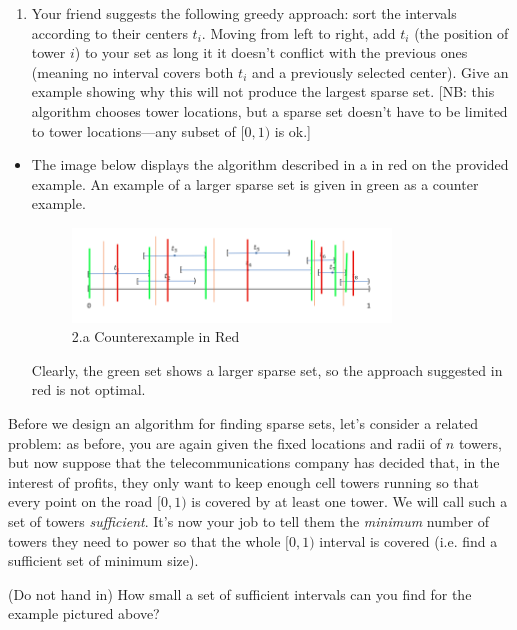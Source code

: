 \documentclass[letterpaper,11pt]{article}
\begin{document}
\begin{enumerate}
\newpage
\begin{enumerate}
    \item Your friend suggests the following greedy approach: sort the intervals according to their centers $t_i$. Moving from left to right, add $t_i$ (the position of tower $i$) to your set as long it it doesn't conflict with the previous ones (meaning no interval covers both $t_i$ and a previously selected center). Give an example showing why this will not produce the largest sparse set. [NB: this algorithm chooses tower locations, but a sparse set doesn't have to be limited to tower locations—any subset of $[0,1)$ is ok.]
\end{enumerate}

\begin{itemize}
    \color{teal}
    \item The image below displays the algorithm described in a in red on the 
        provided example. An example of a larger sparse set is given in green 
        as a counter example.
        \begin{figure}[htpb]
            \centering
            \includegraphics[width=0.8\textwidth]{2a}
            \caption{2.a Counterexample in Red}
            \label{fig:2a}
        \end{figure}

        Clearly, the green set shows a larger sparse set, so the approach
        suggested in red is not optimal.
\end{itemize}


Before we design an algorithm for finding sparse sets, let's consider a related problem: as before, you are again given the fixed locations and radii of $n$ towers, but now suppose that the telecommunications company has decided that, in the interest of profits, they only want to keep enough cell towers running so that every point on the road $[0, 1)$ is covered by at least one tower. We will call such a set of towers \textit{sufficient}. It's now your job to tell them the \emph{minimum} number of towers they need to power so that the whole $[0,1)$ interval is covered (i.e. find a sufficient set of minimum size).

(Do not hand in) How small a set of sufficient intervals can you find for the example pictured above?



\end{enumerate}
\end{document}
